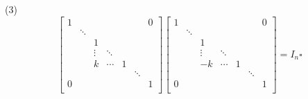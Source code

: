 \documentclass[UTF8]{ctexart}
\begin{document}
\begin{prf}
			(3)$$\begin{bmatrix}
			1 & & & & & & 0\\
			 &\ddots & & & & & \\
			 & & 1 & & & & \\
			 & &\vdots &\ddots & & & \\
			 & & k & \cdots & 1 & & \\
			 & & & & &\ddots & \\
			0 & & & & & & 1\\
			\end{bmatrix}
			\begin{bmatrix}
			1 & & & & & & 0\\
			 &\ddots & & & & & \\
			 & & 1 & & & & \\
			 & &\vdots &\ddots & & & \\
			 & & -k & \cdots & 1 & & \\
			 & & & & &\ddots & \\
			0 & & & & & & 1\\
			\end{bmatrix}=I_n\square$$
		\end{prf}
		
\end{document}
